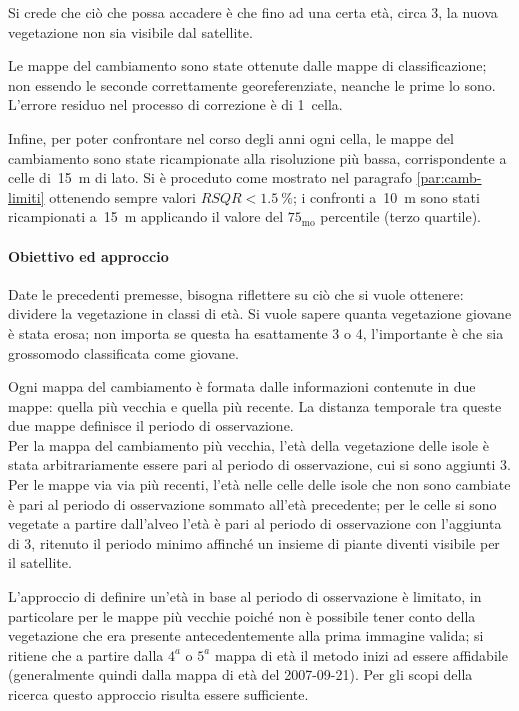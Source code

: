 Si crede che ciò che possa accadere è che fino ad una certa età, circa \SI{3}{\anni}, la nuova vegetazione non sia visibile dal satellite. 

Le mappe del cambiamento sono state ottenute dalle mappe di classificazione; non essendo le seconde correttamente georeferenziate, neanche le prime lo sono. L'errore residuo nel processo di correzione è di 1~cella.

Infine, per poter confrontare nel corso degli anni ogni cella, le mappe del cambiamento sono state ricampionate alla risoluzione più bassa, corrispondente a celle di~\SI{15}{\m} di lato. Si è proceduto come mostrato nel paragrafo \ref{par:camb-limiti} ottenendo sempre valori $RSQR < \SI{1.5}{\percent}$; i confronti a~\SI{10}{\m} sono stati ricampionati a~\SI{15}{\m} applicando il valore del $75_\mathrm{mo}$ percentile (terzo quartile).
 


\paragraph{Obiettivo ed approccio} 
Date le precedenti premesse, bisogna riflettere su ciò che si vuole ottenere: dividere la vegetazione in classi di età.
Si vuole sapere quanta vegetazione giovane è stata erosa; non importa se questa ha esattamente \SI{3}{\anni} o \SI{4}{\anni}, l'importante è che sia grossomodo classificata come giovane.

Ogni mappa del cambiamento è formata dalle informazioni contenute in due mappe: quella più vecchia e quella più recente. La distanza temporale tra queste due mappe definisce il periodo di osservazione.
\\
Per la mappa del cambiamento più vecchia, l'età della vegetazione delle isole è stata arbitrariamente essere pari al periodo di osservazione, cui si sono aggiunti \SI{3}{\anni}.
\\
Per le mappe via via più recenti, l'età nelle celle delle isole che non sono cambiate è pari al periodo di osservazione sommato all'età precedente; per le celle si sono vegetate a partire dall'alveo l'età è pari al periodo di osservazione con l'aggiunta di \SI{3}{\anni}, ritenuto il periodo minimo affinché un insieme di piante diventi visibile per il satellite.

\medskip
L'approccio di definire un'età in base al periodo di osservazione è limitato, in particolare per le mappe più vecchie poiché non è possibile tener conto della vegetazione che era presente antecedentemente alla prima immagine valida;
si ritiene che a partire dalla $4^a$ o $5^a$ mappa di età il metodo inizi ad essere affidabile (generalmente quindi dalla mappa di età del 2007-09-21).
Per gli scopi della ricerca questo approccio risulta essere sufficiente.

